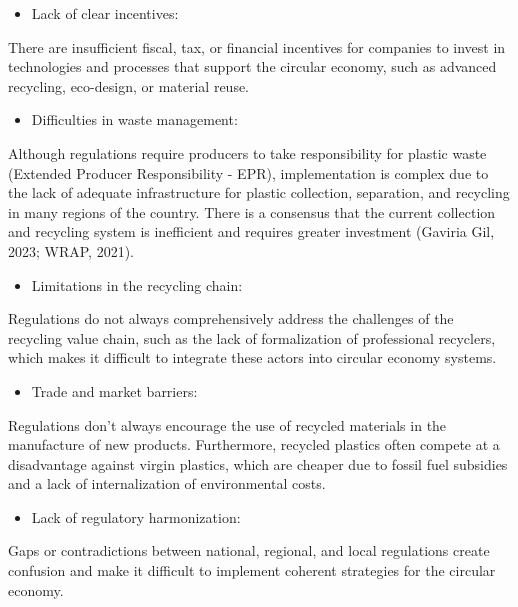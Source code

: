 \documentclass[
  12pt,
  oneside]{book}
\providecommand{\tightlist}{%
  \setlength{\itemsep}{0pt}\setlength{\parskip}{0pt}}
\begin{document}
\begin{itemize}
\tightlist
\item
  Lack of clear incentives:
\end{itemize}

There are insufficient fiscal, tax, or financial incentives for
companies to invest in technologies and processes that support the
circular economy, such as advanced recycling, eco-design, or material
reuse.

\begin{itemize}
\tightlist
\item
  Difficulties in waste management:
\end{itemize}

Although regulations require producers to take responsibility for
plastic waste (Extended Producer Responsibility - EPR), implementation
is complex due to the lack of adequate infrastructure for plastic
collection, separation, and recycling in many regions of the country.
There is a consensus that the current collection and recycling system is
inefficient and requires greater investment (Gaviria Gil, 2023; WRAP,
2021).

\begin{itemize}
\tightlist
\item
  Limitations in the recycling chain:
\end{itemize}

Regulations do not always comprehensively address the challenges of the
recycling value chain, such as the lack of formalization of professional
recyclers, which makes it difficult to integrate these actors into
circular economy systems.

\begin{itemize}
\tightlist
\item
  Trade and market barriers:
\end{itemize}

Regulations don't always encourage the use of recycled materials in the
manufacture of new products. Furthermore, recycled plastics often
compete at a disadvantage against virgin plastics, which are cheaper due
to fossil fuel subsidies and a lack of internalization of environmental
costs.

\begin{itemize}
\tightlist
\item
  Lack of regulatory harmonization:
\end{itemize}

Gaps or contradictions between national, regional, and local regulations
create confusion and make it difficult to implement coherent strategies
for the circular economy.
\end{document}
